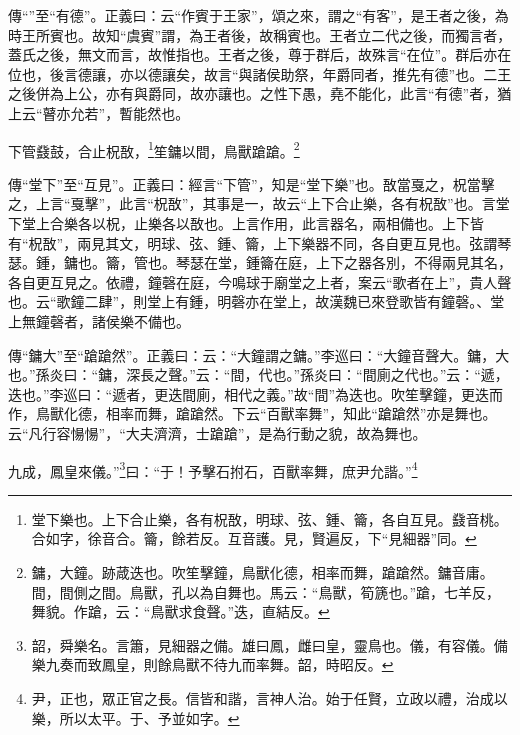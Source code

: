 {\noindent\zhuan{}\fzbyks 傳“”至“有德”。正義曰：云“作賓于王家”，頌之來，謂之“有客”，是王者之後，為時王所賓也。故知“虞賓”謂，為王者後，故稱賓也。王者立二代之後，而獨言者，蓋氏之後，無文而言，故惟指也。王者之後，尊于群后，故殊言“在位”。群后亦在位也，後言德讓，亦以德讓矣，故言“與諸侯助祭，年爵同者，推先有德”也。二王之後併為上公，亦有與爵同，故亦讓也。之性下愚，堯不能化，此言“有德”者，猶上云“瞽亦允若”，暫能然也。 \par}

下管鼗鼓，合止柷敔，\footnote{堂下樂也。上下合止樂，各有柷敔，明球、弦、鍾、籥，各自互見。鼗音桃。合如字，徐音合。籥，餘若反。互音護。見，賢遍反，下“見細器”同。}笙鏞以間，鳥獸蹌蹌。\footnote{鏞，大鐘。跡葴迭也。吹笙擊鐘，鳥獸化德，相率而舞，蹌蹌然。鏞音庸。間，間側之間。鳥獸，孔以為自舞也。馬云：“鳥獸，筍篪也。”蹌，七羊反，舞貌。作蹌，云：“鳥獸求食聲。”迭，直結反。}


{\noindent\zhuan{}\fzbyks 傳“堂下”至“互見”。正義曰：經言“下管”，知是“堂下樂”也。敔當戛之，柷當擊之，上言“戛擊”，此言“柷敔”，其事是一，故云“上下合止樂，各有柷敔”也。言堂下堂上合樂各以柷，止樂各以敔也。上言作用，此言器名，兩相備也。上下皆有“柷敔”，兩見其文，明球、弦、鍾、籥，上下樂器不同，各自更互見也。弦謂琴瑟。鍾，鏞也。籥，管也。琴瑟在堂，鍾籥在庭，上下之器各別，不得兩見其名，各自更互見之。依禮，鐘磬在庭，今鳴球于廟堂之上者，案云“歌者在上”，貴人聲也。云“歌鐘二肆”，則堂上有鍾，明磬亦在堂上，故漢魏已來登歌皆有鐘磬。、堂上無鐘磬者，諸侯樂不備也。 \par}

{\noindent\zhuan{}\fzbyks 傳“鏞大”至“蹌蹌然”。正義曰：云：“大鐘謂之鏞。”李巡曰：“大鐘音聲大。鏞，大也。”孫炎曰：“鏞，深長之聲。”云：“間，代也。”孫炎曰：“間廁之代也。”云：“遞，迭也。”李巡曰：“遞者，更迭間廁，相代之義。”故“間”為迭也。吹笙擊鐘，更迭而作，鳥獸化德，相率而舞，蹌蹌然。下云“百獸率舞”，知此“蹌蹌然”亦是舞也。云“凡行容愓愓”，“大夫濟濟，士蹌蹌”，是為行動之貌，故為舞也。 \par}

九成，鳳皇來儀。”\footnote{韶，舜樂名。言簫，見細器之備。雄曰鳳，雌曰皇，靈鳥也。儀，有容儀。備樂九奏而致鳳皇，則餘鳥獸不待九而率舞。韶，時昭反。}曰：“于！予擊石拊石，百獸率舞，庶尹允諧。”\footnote{尹，正也，眾正官之長。信皆和諧，言神人治。始于任賢，立政以禮，治成以樂，所以太平。于、予並如字。}

